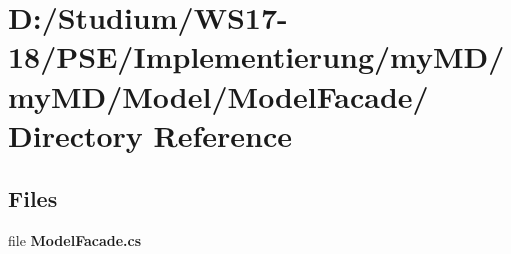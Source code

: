 \hypertarget{dir_D_3A_2FStudium_2FWS17_2D18_2FPSE_2FImplementierung_2FmyMD_2FmyMD_2FModel_2FModelFacade_2F}{
\section{D:/Studium/WS17-18/PSE/Implementierung/my\-MD/my\-MD/Model/Model\-Facade/ Directory Reference}
\label{dir_D_3A_2FStudium_2FWS17_2D18_2FPSE_2FImplementierung_2FmyMD_2FmyMD_2FModel_2FModelFacade_2F}
}


\subsection*{Files}
\begin{CompactItemize}
\item 
file {\bf Model\-Facade.cs}
\end{CompactItemize}
